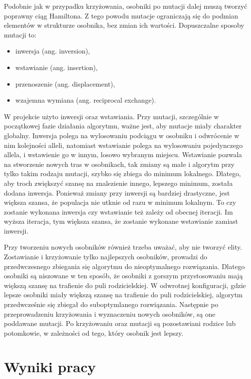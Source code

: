 \documentclass[11pt]{article}
\begin{document}
Podobnie jak w przypadku krzyżowania, osobniki po mutacji dalej muszą tworzyć
poprawny ciąg Hamiltona. Z tego powodu mutacje ograniczają się do podmian
elementów w strukturze osobnika, bez zmian ich wartości. Dopuszczalne sposoby
mutacji to:
\begin{itemize}
    \item inwersja (ang. inversion),
    \item wstawianie (ang. insertion),
    \item przenoszenie (ang. displacement),
    \item wzajemna wymiana (ang. reciprocal exchange).
\end{itemize}
W projekcie użyto inwersji oraz wstawiania. Przy mutacji, szczególnie w
początkowej fazie działania algorytmu, ważne jest, aby mutacje miały charakter
globalny. Inwersja polega na wylosowaniu podciągu w osobniku i odwrócenie w nim
kolejności alleli, natomiast wstawianie polega na wylosowaniu pojedynczego
allela, i wstawienie go w innym, losowo wybranym miejscu. Wstawianie pozwala na
stworzenie nowych tras w osobnikach, tak zmiany są małe i algorytm przy tylko
takim rodzaju mutacji, szybko się zbiega do minimum lokalnego. Dlatego, aby
troch zwiększyć szansę na znalezienie innego, lepszego minimum, została dodana
inwersja. Ponieważ zmiany przy inwersji są bardziej drastyczne, jest większa
szansa, że populacja nie utknie od razu w minimum lokalnym. To czy zostanie
wykonana inwersja czy wstawianie też zależy od obecnej iteracji. Im wyższa
iteracja, tym większa szansa, że zostanie wykonane wstawianie zamiast inwersji.

Przy tworzeniu nowych osobników również trzeba uważać, aby nie tworzyć elity.
Zostawianie i krzyżowanie tylko najlepszych osobników, prowadzi do
przedwczesnego zbiegania się algorytmu do nieoptymalnego rozwiązania. Dlatego
osobniki są niszowane w ten sposób, że osobniki z gorszym przystosowaniu mają
większą szansę na trafienie do puli rodzicielskiej. W odwrotnej konfiguracji,
gdzie lepsze osobniki miały większą szansę na trafienie do puli rodzicielskiej,
algorytm przedwcześnie się zbiegał do suboptymlanego rozwiązania. Następnie po
przeprowadzeniu krzyżowania i wyznaczeniu nowych osobników, są one poddawane
mutacji. Po krzyżowaniu oraz mutacji są pozostawiani rodzice lub potomkowie, w
zależności od tego, który osobnik jest lepszy.

\section{Wyniki pracy}
\end{document}
